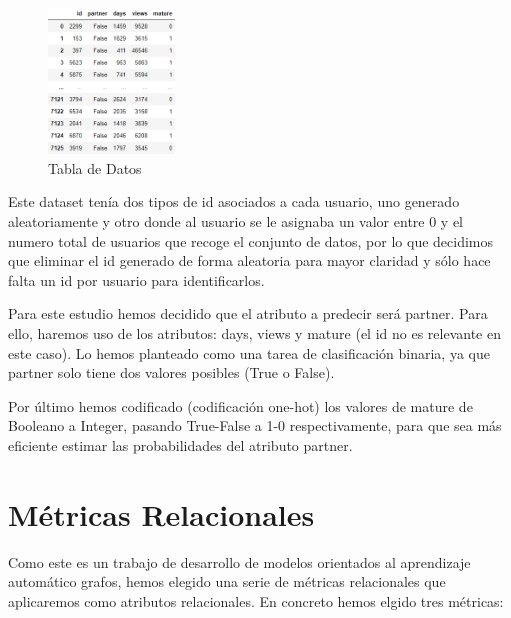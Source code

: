 \documentclass[conference,a4paper]{IEEEtran}
\begin{document}
\begin{figure} %
    \centering
    \includegraphics[width=0.3\textwidth]{./ImagenesMemoria/dataset}
    \caption{\label{fig:dataset}Tabla de Datos}
\end{figure}

Este dataset tenía dos tipos de id asociados a cada usuario, uno generado aleatoriamente y otro donde al usuario se le asignaba un valor entre 0 y el numero total de usuarios que recoge el conjunto de datos, por lo que decidimos que eliminar el id generado de forma aleatoria para mayor claridad y sólo hace falta un id por usuario para identificarlos.


Para este estudio hemos decidido que el atributo a predecir será partner. Para ello, haremos uso de los atributos: days, views y mature (el id no es relevante en este caso). Lo hemos planteado como una tarea de clasificación binaria, ya que partner solo tiene dos valores posibles (True o False).

 Por último hemos codificado (codificación one-hot) los valores de mature de Booleano a Integer, pasando True-False a 1-0 respectivamente, para que sea más eficiente estimar las probabilidades del atributo partner.

\section{Métricas Relacionales}
Como este es un trabajo de desarrollo de modelos orientados al aprendizaje automático grafos, hemos elegido una serie de métricas relacionales que aplicaremos como atributos relacionales. En concreto hemos elgido tres métricas:
\end{document}
